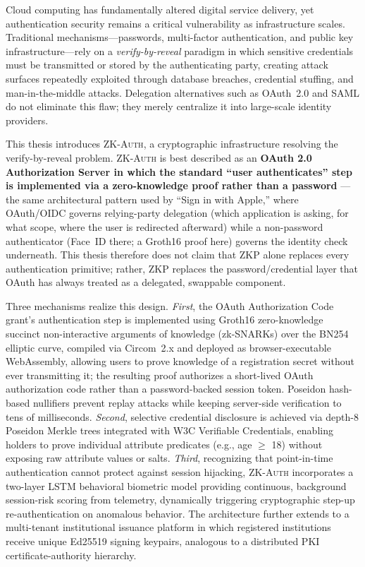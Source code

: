 \documentclass[12pt,a4paper,oneside]{report}
\begin{document}
Cloud computing has fundamentally altered digital service delivery, yet
authentication security remains a critical vulnerability as infrastructure
scales. Traditional mechanisms---passwords, multi-factor authentication, and
public key infrastructure---rely on a \textit{verify-by-reveal} paradigm in
which sensitive credentials must be transmitted or stored by the
authenticating party, creating attack surfaces repeatedly exploited through
database breaches, credential stuffing, and man-in-the-middle attacks.
Delegation alternatives such as OAuth~2.0 and SAML do not eliminate this
flaw; they merely centralize it into large-scale identity providers.

This thesis introduces \textsc{ZK-Auth}, a cryptographic infrastructure
resolving the verify-by-reveal problem. \textsc{ZK-Auth} is best described
as an \textbf{OAuth 2.0 Authorization Server in which the standard
``user authenticates'' step is implemented via a zero-knowledge proof
rather than a password} --- the same architectural pattern used by
``Sign in with Apple,'' where OAuth/OIDC governs relying-party delegation
(which application is asking, for what scope, where the user is redirected
afterward) while a non-password authenticator (Face~ID there; a Groth16
proof here) governs the identity check underneath. This thesis therefore
does not claim that ZKP alone replaces every authentication primitive;
rather, ZKP replaces the password/credential layer that OAuth has always
treated as a delegated, swappable component.

Three mechanisms realize this design. \textit{First}, the OAuth
Authorization Code grant's authentication step is implemented using
Groth16 zero-knowledge succinct non-interactive arguments of knowledge
(zk-SNARKs) over the BN254 elliptic curve, compiled via Circom~2.x and
deployed as browser-executable WebAssembly, allowing users to prove
knowledge of a registration secret without ever transmitting it; the
resulting proof authorizes a short-lived OAuth authorization code rather
than a password-backed session token. Poseidon hash-based nullifiers
prevent replay attacks while keeping server-side verification to tens of
milliseconds. \textit{Second}, selective credential disclosure
is achieved via depth-8 Poseidon Merkle trees integrated with W3C
Verifiable Credentials, enabling holders to prove individual attribute
predicates (e.g., age $\geq$ 18) without exposing raw attribute values or
salts. \textit{Third}, recognizing that point-in-time authentication
cannot protect against session hijacking, \textsc{ZK-Auth} incorporates a
two-layer LSTM behavioral biometric model providing continuous,
background session-risk scoring from telemetry, dynamically triggering
cryptographic step-up re-authentication on anomalous behavior. The
architecture further extends to a multi-tenant institutional issuance
platform in which registered institutions receive unique Ed25519 signing
keypairs, analogous to a distributed PKI certificate-authority hierarchy.
\end{document}
